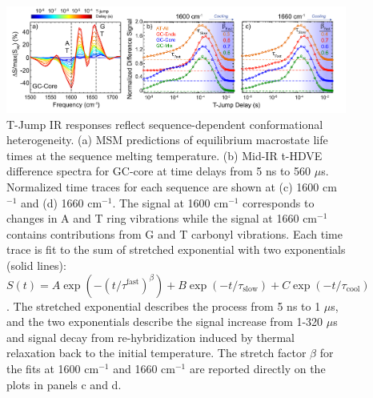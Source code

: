 \documentclass[journal=jpcbfk,manuscript=article]{achemso}
\begin{document}
\begin{figure}[ht!]
	\begin{center} 
        \includegraphics[width=1.0\textwidth]{Fig5.pdf}
        \caption{T-Jump IR responses reflect sequence-dependent conformational heterogeneity. (a) MSM predictions of equilibrium macrostate life times at the sequence melting temperature. (b) Mid-IR t-HDVE difference spectra for GC-core at time delays from 5 ns to 560 $\mu$s. Normalized time traces for each sequence are shown at (c) 1600 cm$^{-1}$ and (d) 1660 cm$^{-1}$. The signal at 1600 cm$^{-1}$ corresponds to changes in A and T ring vibrations while the signal at 1660 cm$^{-1}$ contains contributions from G and T carbonyl vibrations. Each time trace is fit to the sum of stretched exponential with two exponentials (solid lines): $S(t) = A\exp{(-(t/\tau^{\mathrm{fast}})^{\beta})} + B\exp{(-t/\tau_{\mathrm{slow}})}+C\exp{(-t/\tau_{\mathrm{cool}})}$. The stretched exponential describes the process from 5 ns to 1 $\mu$s, and the two exponentials describe the signal increase from 1-320 $\mu$s and signal decay from re-hybridization induced by thermal relaxation back to the initial temperature. The stretch factor $\beta$ for the fits at 1600 cm$^{-1}$ and 1660 cm$^{-1}$ are reported directly on the plots in panels c and d.
        }
        \label{fig:T-jump_stretching}
	\end{center}
\end{figure}

   
 
   

\end{document}

